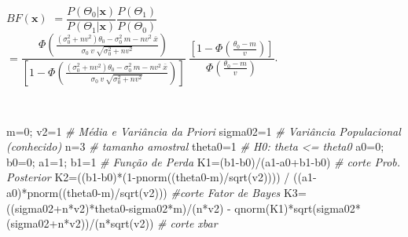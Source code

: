 \documentclass[
]{book}
\newenvironment{Shaded}{\begin{snugshade}}{\end{snugshade}}
\newcommand{\CommentTok}[1]{\textcolor[rgb]{0.56,0.35,0.01}{\textit{#1}}}
\newcommand{\DecValTok}[1]{\textcolor[rgb]{0.00,0.00,0.81}{#1}}
\newcommand{\FunctionTok}[1]{\textcolor[rgb]{0.00,0.00,0.00}{#1}}
\newcommand{\NormalTok}[1]{#1}
\newcommand{\OtherTok}[1]{\textcolor[rgb]{0.56,0.35,0.01}{#1}}
\newcommand{\SpecialCharTok}[1]{\textcolor[rgb]{0.00,0.00,0.00}{#1}}
\begin{document}
\(BF(\boldsymbol x)\)
\(= \dfrac{P(\Theta_0|\boldsymbol x)}{P(\Theta_1|\boldsymbol x)} \dfrac{P(\Theta_1)}{P(\Theta_0)}\)
\(= \dfrac{\Phi\left(\frac{({\sigma}_0^2+nv^2)\theta_0-{\sigma}_0^2~m-nv^2~\bar x}{{\sigma}_0~v~\sqrt{{\sigma}_0^2+nv^2}}\right)}{\left[1-\Phi\left(\frac{({\sigma}_0^2+nv^2)\theta_0-{\sigma}_0^2~m-nv^2~\bar x}{{\sigma}_0~v~\sqrt{{\sigma}_0^2+nv^2}}\right)\right]} ~ \dfrac{\left[1-\Phi\left(\frac{\theta_0-m}{v}\right)\right]}{\Phi\left(\frac{\theta_0-m}{v}\right)}\).

\(~\)

\begin{Shaded}
\begin{Highlighting}[]
\NormalTok{m}\OtherTok{=}\DecValTok{0}\NormalTok{; v2}\OtherTok{=}\DecValTok{1} \CommentTok{\# Média e Variância da Priori}
\NormalTok{sigma02}\OtherTok{=}\DecValTok{1} \CommentTok{\# Variância Populacional (conhecido)}
\NormalTok{n}\OtherTok{=}\DecValTok{3} \CommentTok{\# tamanho amostral}
\NormalTok{theta0}\OtherTok{=}\DecValTok{1} \CommentTok{\# H0: theta \textless{}= theta0}
\NormalTok{a0}\OtherTok{=}\DecValTok{0}\NormalTok{; b0}\OtherTok{=}\DecValTok{0}\NormalTok{; a1}\OtherTok{=}\DecValTok{1}\NormalTok{; b1}\OtherTok{=}\DecValTok{1} \CommentTok{\# Função de Perda}
\NormalTok{K1}\OtherTok{=}\NormalTok{(b1}\SpecialCharTok{{-}}\NormalTok{b0)}\SpecialCharTok{/}\NormalTok{(a1}\SpecialCharTok{{-}}\NormalTok{a0}\SpecialCharTok{+}\NormalTok{b1}\SpecialCharTok{{-}}\NormalTok{b0) }\CommentTok{\# corte Prob. Posterior}
\NormalTok{K2}\OtherTok{=}\NormalTok{((b1}\SpecialCharTok{{-}}\NormalTok{b0)}\SpecialCharTok{*}\NormalTok{(}\DecValTok{1}\SpecialCharTok{{-}}\FunctionTok{pnorm}\NormalTok{((theta0}\SpecialCharTok{{-}}\NormalTok{m)}\SpecialCharTok{/}\FunctionTok{sqrt}\NormalTok{(v2)))) }\SpecialCharTok{/}\NormalTok{ ((a1}\SpecialCharTok{{-}}\NormalTok{a0)}\SpecialCharTok{*}\FunctionTok{pnorm}\NormalTok{((theta0}\SpecialCharTok{{-}}\NormalTok{m)}\SpecialCharTok{/}\FunctionTok{sqrt}\NormalTok{(v2))) }\CommentTok{\#corte Fator de Bayes}
\NormalTok{K3}\OtherTok{=}\NormalTok{((sigma02}\SpecialCharTok{+}\NormalTok{n}\SpecialCharTok{*}\NormalTok{v2)}\SpecialCharTok{*}\NormalTok{theta0}\SpecialCharTok{{-}}\NormalTok{sigma02}\SpecialCharTok{*}\NormalTok{m)}\SpecialCharTok{/}\NormalTok{(n}\SpecialCharTok{*}\NormalTok{v2) }\SpecialCharTok{{-}} \FunctionTok{qnorm}\NormalTok{(K1)}\SpecialCharTok{*}\FunctionTok{sqrt}\NormalTok{(sigma02}\SpecialCharTok{*}\NormalTok{(sigma02}\SpecialCharTok{+}\NormalTok{n}\SpecialCharTok{*}\NormalTok{v2))}\SpecialCharTok{/}\NormalTok{(n}\SpecialCharTok{*}\FunctionTok{sqrt}\NormalTok{(v2)) }\CommentTok{\# corte xbar}

\end{Highlighting}
\end{Shaded}
\end{document}
